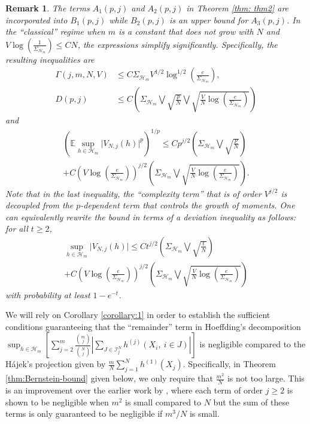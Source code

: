 \documentclass[12pt]{article}
\def\l{\left}
\def\r{\right}
\newcommand{\m}{\mathcal}
\newcommand{\mb}{\mathbb}
\theoremstyle{thmstyletwo}%
\newtheorem{remark}{Remark}%
\theoremstyle{thmstylethree}%
\begin{document}
\begin{remark}
\label{remark:small-m}
The terms $A_1(p,j)$ and $A_2(p,j)$ in Theorem \ref{thm: thm2} are incorporated into $B_1(p,j)$ while $B_2(p,j)$ is an upper bound for $A_3(p,j)$. 
In the ``classical'' regime when $m$ is a constant that does not grow with $N$ and $V\log\l(\frac{1}{\Sigma_{\m H_m}}\r)\leq CN$, the expressions simplify significantly. Specifically, the resulting inequalities are
\begin{align*}    
\Gamma(j,m,N,V)& \leq C \Sigma_{\m H_m }V^{1/2}\log^{1/2}\l(\frac{e}{\Sigma_{\m H_m}}\r),
\\
D(p,j)& \leq C\l(\Sigma_{\m H_m } \bigvee \sqrt{\frac{p}{N}}\bigvee \sqrt{\frac{V}{N}\log\l(\frac{e}{\Sigma_{\m H_m}} \r)} \r)
\end{align*}
and
\begin{multline*}
\l(\mb E \sup_{h \in \mathcal{H}_m} \lvert V_{N,j}(h) \rvert^p \r)^{1/p}  
\leq 
C p^{j/2}
\l(\Sigma_{\m H_m}\bigvee \sqrt{\frac{p}{N}}\r)
\\
+C\l(V \log\l(\frac{e}{\Sigma_{\m H_m}}\r)\r)^{j/2}
\l(\Sigma_{\m H_m}\bigvee \sqrt{\frac{V}{N}\log\l(\frac{e}{\Sigma_{\m H_m}} \r)}\r).
\end{multline*}
Note that in the last inequality, the ``complexity term'' that is of order $V^{j/2}$ is decoupled from the $p$-dependent term that controls the growth of moments. 
One can equivalently rewrite the bound in terms of a deviation inequality as follows: for all $t\geq 2$, 
\begin{multline*}
\sup_{h \in \mathcal{H}_m} \lvert V_{N,j}(h) \rvert  
\leq 
C t^{j/2}
\l(\Sigma_{\m H_m}\bigvee \sqrt{\frac{t}{N}}\r)
\\
+C\l(V \log\l(\frac{e}{\Sigma_{\m H_m}}\r)\r)^{j/2}
\l(\Sigma_{\m H_m}\bigvee \sqrt{\frac{V}{N}\log\l(\frac{e}{\Sigma_{\m H_m}} \r)}\r)
\end{multline*}
with probability at least $1-e^{-t}$.
\end{remark}
We will rely on Corollary \ref{corollary:1} in order to establish the sufficient conditions guaranteeing that the ``remainder'' term in Hoeffding's decomposition $\sup_{h\in \m H_m} \l[\sum_{j=2}^m \frac{{m \choose j}}{{N \choose j}} \l| \sum_{J \in \mathcal{I}^N_j} h^{(j)}\l(X_i,\  i \in J\r)\r|\r]$ is negligible compared to the H\'{a}jek's projection given by $\frac{m}{N} \sum_{j=1}^N h^{(1)}\l(X_j\r)$. Specifically, in Theorem \ref{thm:Bernstein-bound} given below, we only require that $\frac{m^2}{N}$ is not too large. 
This is an improvement over the earlier work by \citet{heilig2001limit}, where each term of order $j\geq 2$ is shown to be negligible when $m^2$ is small compared to $N$ but the sum of these terms is only guaranteed to be negligible if $m^3/N$ is small. 
\end{document}
